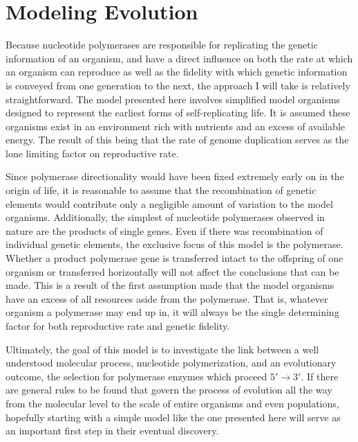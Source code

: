 \section*{Modeling Evolution} %
\label{sec:modeling_evolution}
Because nucleotide polymerases are responsible for replicating the genetic information of an organism, and have a direct influence on both the rate at which an organism can reproduce as well as the fidelity with which genetic information is conveyed from one generation to the next, the approach I will take is relatively straightforward. The model presented here involves simplified model organisms designed to represent the earliest forms of self-replicating life. It is assumed these organisms exist in an environment rich with nutrients and an excess of available energy. The result of this being that the rate of genome duplication serves as the lone limiting factor on reproductive rate.

Since polymerase directionality would have been fixed extremely early on in the origin of life, it is reasonable to assume that the recombination of genetic elements would contribute only a negligible amount of variation to the model organisms. Additionally, the simplest of nucleotide polymerases observed in nature are the products of single genes. Even if there was recombination of individual genetic elements, the exclusive focus of this model is the polymerase. Whether a product polymerase gene is transferred intact to the offspring of one organism or transferred horizontally will not affect the conclusions that can be made. This is a result of the first assumption made that the model organisms have an excess of all resources aside from the polymerase. That is, whatever organism a polymerase may end up in, it will always be the single determining factor for both reproductive rate and genetic fidelity.

Ultimately, the goal of this model is to investigate the link between a well understood molecular process, nucleotide polymerization, and an evolutionary outcome, the selection for polymerase enzymes which proceed $5'\to3'$. If there are general rules to be found that govern the process of evolution all the way from the molecular level to the scale of entire organisms and even populations, hopefully starting with a simple model like the one presented here will serve as an important first step in their eventual discovery.

